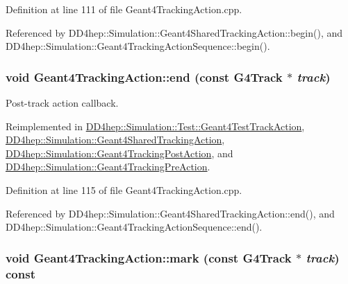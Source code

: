 Definition at line 111 of file Geant4TrackingAction.cpp.

Referenced by DD4hep::Simulation::Geant4SharedTrackingAction::begin(), and DD4hep::Simulation::Geant4TrackingActionSequence::begin().\hypertarget{class_d_d4hep_1_1_simulation_1_1_geant4_tracking_action_a29f980c180576781771ea325b4a73f14}{
\subsubsection[{end}]{\setlength{\rightskip}{0pt plus 5cm}void Geant4TrackingAction::end (const G4Track $\ast$ {\em track})}}
\label{class_d_d4hep_1_1_simulation_1_1_geant4_tracking_action_a29f980c180576781771ea325b4a73f14}


Post-\/track action callback. 

Reimplemented in \hyperlink{class_d_d4hep_1_1_simulation_1_1_test_1_1_geant4_test_track_action_a41bc0c1912089342579388ae2c176c69}{DD4hep::Simulation::Test::Geant4TestTrackAction}, \hyperlink{class_d_d4hep_1_1_simulation_1_1_geant4_shared_tracking_action_a35f435a97bbe15def248f21f37847a12}{DD4hep::Simulation::Geant4SharedTrackingAction}, \hyperlink{class_d_d4hep_1_1_simulation_1_1_geant4_tracking_post_action_ac64fbbb53136a1696ac45c060fdcde70}{DD4hep::Simulation::Geant4TrackingPostAction}, and \hyperlink{class_d_d4hep_1_1_simulation_1_1_geant4_tracking_pre_action_a372b3efd2f2ac8f2c75bb435fd286ac3}{DD4hep::Simulation::Geant4TrackingPreAction}.

Definition at line 115 of file Geant4TrackingAction.cpp.

Referenced by DD4hep::Simulation::Geant4SharedTrackingAction::end(), and DD4hep::Simulation::Geant4TrackingActionSequence::end().\hypertarget{class_d_d4hep_1_1_simulation_1_1_geant4_tracking_action_a4f079e43bef8d199948f964ea6a64691}{
\subsubsection[{mark}]{\setlength{\rightskip}{0pt plus 5cm}void Geant4TrackingAction::mark (const G4Track $\ast$ {\em track}) const}}
\label{class_d_d4hep_1_1_simulation_1_1_geant4_tracking_action_a4f079e43bef8d199948f964ea6a64691}


